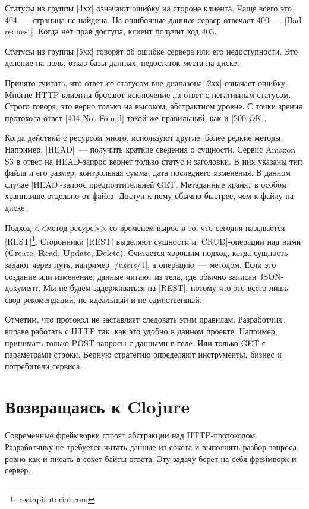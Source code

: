 Статусы из группы \spverb|4хх| означают ошибку на стороне клиента. Чаще всего это 404~---
страница не найдена. На ошибочные данные сервер отвечает 400~--- \spverb|Bad request|.
Когда нет прав доступа, клиент получит код 403.

Статусы из группы \spverb|5хх| говорят об ошибке сервера или его
недоступности. Это деление на ноль, отказ базы данных, недостаток места
на диске.

Принято считать, что ответ со статусом вне диапазона \spverb|2хх| означает
ошибку. Многие HTTP-клиенты бросают исключение на ответ с негативным статусом.
Строго говоря, это верно только на высоком, абстрактном уровне. С точки
зрения протокола ответ \spverb|404 Not Found| такой же правильный, как и \spverb|200 OK|.

Когда действий с ресурсом много, используют другие, более редкие
методы. Например, \spverb|HEAD|~--- получить краткие сведения о сущности. Сервис
Amazon S3 в ответ на HEAD-запрос вернет только статус и заголовки. В них указаны
тип файла и его размер, контрольная сумма, дата последнего изменения. В данном
случае \spverb|HEAD|-запрос предпочтительней GET. Метаданные хранят в особом
хранилище отдельно от файла. Доступ к нему обычно быстрее, чем к файлу на диске.

Подход <<метод-ресурс>> со временем вырос в то, что сегодня называется
\spverb|REST|\footnote{restapitutorial.com}. Сторонники
\spverb|REST| выделяют сущности и \spverb|CRUD|-операции над ними (\textbf{C}reate,
\textbf{R}ead, \textbf{U}pdate, \textbf{D}elete). Считается хорошим подход,
когда сущность задают через путь, например \spverb|/users/1|, а операцию~---
методом. Если это создание или изменение, данные читают из тела, где обычно записан
JSON-документ. Мы не будем задерживаться на \spverb|REST|, потому что это всего лишь
свод рекомендаций, не идеальный и не единственный.

Отметим, что протокол не заставляет следовать этим правилам. Разработчик вправе
работать с HTTP так, как это удобно в данном проекте. Например, принимать только
POST-запросы с данными в теле. Или только GET с параметрами строки. Верную
стратегию определяют инструменты, бизнес и потребители сервиса.


\section{Возвращаясь к Clojure}

Современные фреймворки строят абстракции над HTTP-протоколом. Разработчику не
требуется читать данные из сокета и выполнять разбор запроса, ровно как и писать
в сокет байты ответа. Эту задачу берет на себя фреймворк и сервер.

